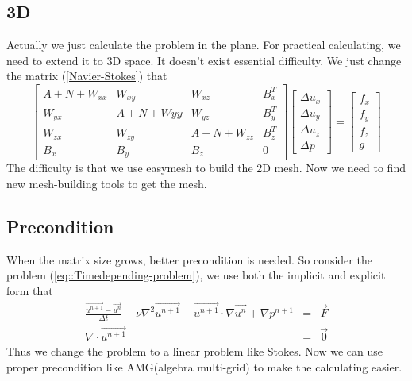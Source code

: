 \documentclass[a4paper]{article}
\begin{document}
\subsection{3D}
Actually we just calculate the problem in the plane. For practical calculating, we need to extend it to 3D space. It doesn't exist essential difficulty. We just change the matrix (\ref{Navier-Stokes}) that
\begin{equation}
\left[ \begin{array}{cccc}
A + N +W_{xx} & W_{xy} & W_{xz} & B_x^T \\
W_{yx} & A +N +W{yy}& W_{yz} & B_y^T \\
W_{zx} & W_{zy}  &A + N + W_{zz} & B_z^T \\
B_x & B_y &B_z& 0
\end{array}
\right]
\left[\begin{array}{cccc}
\Delta u_x\\
\Delta u_y\\
\Delta u_z\\
\Delta p
\end{array}
\right]=
\left[\begin{array}{cccc}
f_x\\
f_y\\
f_z\\
g
\end{array}
\right]
\label{3D-Navier-Stokes}
\end{equation}
The difficulty is that we use easymesh to build the 2D mesh. Now we need to find new mesh-building tools to get the mesh.
\subsection{Precondition}
When the matrix size grows, better precondition is needed. So consider the problem (\ref{eq::Timedepending-problem}), we use both the implicit and explicit form that 
\begin{equation}
\begin{array}{rcl}
\frac{\vec{u^{n+1}}-\vec{u^n}}{\Delta t} - \nu \nabla^2 \vec{u^{n+1}} + \vec{u^{n+1}}\cdot \nabla \vec{u^n} + \nabla p^{n+1} &=& \vec{F} \\
\nabla \cdot \vec{u^{n+1}} &=& \vec{0}
\label{eq::implicit and explicit}
\end{array}
\end{equation}
Thus we change the problem to a linear problem like Stokes. Now we can use proper precondition like AMG(algebra multi-grid) to make the calculating easier.



\end{document}

